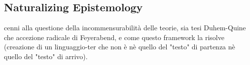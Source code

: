 \documentclass[a4paper]{../birkjour}
\begin{document}
\subsection{Naturalizing Epistemology}
cenni alla questione della incommensurabilità delle teorie, sia tesi Duhem-Quine che accezione radicale di Feyerabend, e come questo framework la risolve (creazione di un linguaggio-ter che non è nè quello del "testo" di partenza nè quello del "testo" di arrivo). 
 
{}

\end{document}
